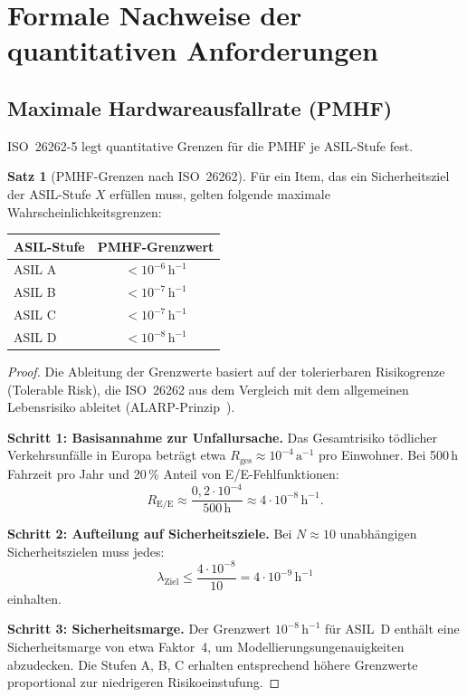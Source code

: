 ﻿\documentclass[a4paper,12pt]{article}
\theoremstyle{definition}
\newtheorem{satz}{Satz}
\begin{document}
\section{Formale Nachweise der quantitativen Anforderungen}

\subsection{Maximale Hardwareausfallrate (PMHF)}

ISO~26262-5 legt quantitative Grenzen für die PMHF je ASIL-Stufe fest.

\begin{satz}[PMHF-Grenzen nach ISO~26262]
\label{satz:pmhf}
  Für ein Item, das ein Sicherheitsziel der ASIL-Stufe $X$ erfüllen
  muss, gelten folgende maximale Wahrscheinlichkeitsgrenzen:
  \begin{center}
    \begin{tabular}{lc}
      \toprule
      ASIL-Stufe & PMHF-Grenzwert\\
      \midrule
      ASIL A & $< 10^{-6}\,\mathrm{h}^{-1}$\\
      ASIL B & $< 10^{-7}\,\mathrm{h}^{-1}$\\
      ASIL C & $< 10^{-7}\,\mathrm{h}^{-1}$\\
      ASIL D & $< 10^{-8}\,\mathrm{h}^{-1}$\\
      \bottomrule
    \end{tabular}
  \end{center}
\end{satz}

\begin{proof}
  Die Ableitung der Grenzwerte basiert auf der tolerierbaren
  Risikogrenze (Tolerable Risk), die ISO~26262 aus dem Vergleich mit
  dem allgemeinen Lebensrisiko ableitet (ALARP-Prinzip~\cite{health_safety_1992}).

  \textbf{Schritt 1: Basisannahme zur Unfallursache.}
  Das Gesamtrisiko tödlicher Verkehrsunfälle in Europa beträgt etwa
  $R_{\mathrm{ges}} \approx 10^{-4}\,\mathrm{a}^{-1}$ pro Einwohner.
  Bei 500\,h Fahrzeit pro Jahr und 20\,\% Anteil von
  E/E-Fehlfunktionen:
  \[
    R_{\mathrm{E/E}}
    \approx \frac{0{,}2 \cdot 10^{-4}}{500\,\mathrm{h}}
    \approx 4 \cdot 10^{-8}\,\mathrm{h}^{-1}.
  \]

  \textbf{Schritt 2: Aufteilung auf Sicherheitsziele.}
  Bei $N \approx 10$ unabhängigen Sicherheitszielen muss jedes:
  \[
    \lambda_{\mathrm{Ziel}}
    \leq \frac{4 \cdot 10^{-8}}{10}
    = 4 \cdot 10^{-9}\,\mathrm{h}^{-1}
  \]
  einhalten.

  \textbf{Schritt 3: Sicherheitsmarge.}
  Der Grenzwert $10^{-8}\,\mathrm{h}^{-1}$ für ASIL~D enthält eine
  Sicherheitsmarge von etwa Faktor~4, um Modellierungsungenauigkeiten
  abzudecken. Die Stufen A, B, C erhalten entsprechend höhere
  Grenzwerte proportional zur niedrigeren Risikoeinstufung.
\end{proof}
\end{document}
